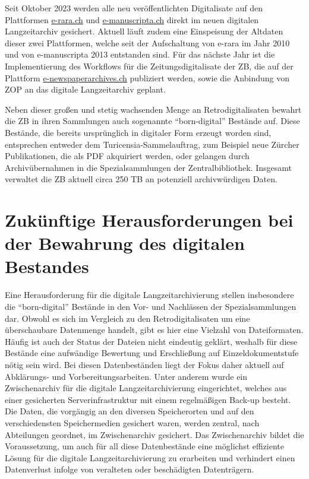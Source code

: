 \documentclass[a4paper,
fontsize=11pt,
oneside,
numbers=noperiodatend,
parskip=half-,
bibliography=totoc,
final
]{scrartcl}
\begin{document}
Seit Oktober 2023 werden alle neu veröffentlichten Digitalisate auf den
Plattformen \href{https://www.e-rara.ch/}{e-rara.ch} und
\href{https://www.e-manuscripta.ch/}{e-manuscripta.ch} direkt im neuen
digitalen Langzeitarchiv gesichert. Aktuell läuft zudem eine Einspeisung
der Altdaten dieser zwei Plattformen, welche seit der Aufschaltung von
e-rara im Jahr 2010 und von e-manuscripta 2013 entstanden sind. Für das
nächste Jahr ist die Implementierung des Workflows für die
Zeitungsdigitalisate der ZB, die auf der Plattform
\href{http://e-newspaperarchives.ch}{e-newspaperarchives.ch} publiziert
werden, sowie die Anbindung von ZOP an das digitale Langzeitarchiv
geplant.

Neben dieser großen und stetig wachsenden Menge an Retrodigitalisaten
bewahrt die ZB in ihren Sammlungen auch sogenannte
\enquote{born-digital} Bestände auf. Diese Bestände, die bereits
ursprünglich in digitaler Form erzeugt worden sind, entsprechen entweder
dem Turicensia-Sammelauftrag, zum Beispiel neue Zürcher Publikationen,
die als PDF akquiriert werden, oder gelangen durch Archivübernahmen in
die Spezialsammlungen der Zentralbibliothek. Insgesamt verwaltet die ZB
aktuell circa 250 TB an potenziell archivwürdigen Daten.

\hypertarget{zukuxfcnftige-herausforderungen-bei-der-bewahrung-des-digitalen-bestandes}{%
\section{Zukünftige Herausforderungen bei der Bewahrung des
digitalen
Bestandes}\label{zukuxfcnftige-herausforderungen-bei-der-bewahrung-des-digitalen-bestandes}}

Eine Herausforderung für die digitale Langzeitarchivierung stellen
insbesondere die \enquote{born-digital} Bestände in den Vor- und
Nachlässen der Spezialsammlungen dar. Obwohl es sich im Vergleich zu den
Retrodigitalisaten um eine überschaubare Datenmenge handelt, gibt es
hier eine Vielzahl von Dateiformaten. Häufig ist auch der Status der
Dateien nicht eindeutig geklärt, weshalb für diese Bestände eine
aufwändige Bewertung und Erschließung auf Einzeldokumentstufe nötig sein
wird. Bei diesen Datenbeständen liegt der Fokus daher aktuell auf
Abklärungs- und Vorbereitungsarbeiten. Unter anderem wurde ein
Zwischenarchiv für die digitale Langzeitarchivierung eingerichtet,
welches aus einer gesicherten Serverinfrastruktur mit einem regelmäßigen
Back-up besteht. Die Daten, die vorgängig an den diversen Speicherorten
und auf den verschiedensten Speichermedien gesichert waren, werden
zentral, nach Abteilungen geordnet, im Zwischenarchiv gesichert. Das
Zwischenarchiv bildet die Voraussetzung, um auch für all diese
Datenbestände eine möglichst effiziente Lösung für die digitale
Langzeitarchivierung zu erarbeiten und verhindert einen Datenverlust
infolge von veralteten oder beschädigten Datenträgern.
\end{document}
